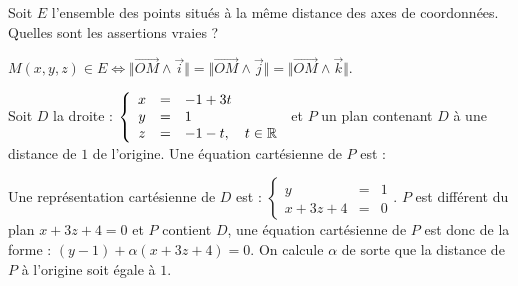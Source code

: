 \begin{question} 

Soit  $E$ l'ensemble des points situés à la même distance  des axes de coordonnées. Quelles sont les assertions vraies ?
\begin{answers}

     
       
       
         
\end{answers}
\begin{explanations}
$M(x,y,z) \in E \Leftrightarrow   \Vert \overrightarrow {OM} \wedge \vec{i} \Vert
 =  \Vert \overrightarrow {OM} \wedge \vec{j} \Vert =  \Vert \overrightarrow {OM} \wedge \vec{k} \Vert$.
\end{explanations}

\end{question}


\begin{question} 

Soit  $D$ la droite : $\left\{\begin{array}{ccl}x&=&-1+3t\\y&=&1\\z&=&-1-t, \quad t\in \mathbb{R}  \end{array}\right.$ et $P$ un plan contenant $D$ à une distance de $1$ de l'origine. Une équation cartésienne de $P$ est : 
\begin{answers}
 
    
   
   
\end{answers}
\begin{explanations}
Une représentation cartésienne de $D$ est : $\left\{\begin{array}{ccl}y&=&1\\x+3z+4&=&0  \end{array}\right.$. $P$ est différent du plan $x+3z+4=0$ et $P$ contient $D$, une équation cartésienne de $P$ est donc de la forme : $(y-1)+\alpha(x+3z+4)=0$. On calcule $\alpha$ de sorte que la distance de $P$ à l'origine soit égale à $1$.
\end{explanations}

\end{question}







